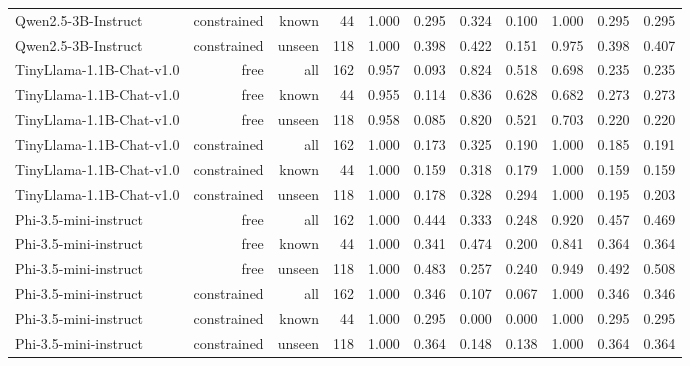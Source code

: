 \begin{table}[t]
\begin{tabular}{lrrrrrrrrrr}
Qwen2.5-3B-Instruct & constrained & known & 44 & 1.000 & 0.295 & 0.324 & 0.100 & 1.000 & 0.295 & 0.295 \\
Qwen2.5-3B-Instruct & constrained & unseen & 118 & 1.000 & 0.398 & 0.422 & 0.151 & 0.975 & 0.398 & 0.407 \\
TinyLlama-1.1B-Chat-v1.0 & free & all & 162 & 0.957 & 0.093 & 0.824 & 0.518 & 0.698 & 0.235 & 0.235 \\
TinyLlama-1.1B-Chat-v1.0 & free & known & 44 & 0.955 & 0.114 & 0.836 & 0.628 & 0.682 & 0.273 & 0.273 \\
TinyLlama-1.1B-Chat-v1.0 & free & unseen & 118 & 0.958 & 0.085 & 0.820 & 0.521 & 0.703 & 0.220 & 0.220 \\
TinyLlama-1.1B-Chat-v1.0 & constrained & all & 162 & 1.000 & 0.173 & 0.325 & 0.190 & 1.000 & 0.185 & 0.191 \\
TinyLlama-1.1B-Chat-v1.0 & constrained & known & 44 & 1.000 & 0.159 & 0.318 & 0.179 & 1.000 & 0.159 & 0.159 \\
TinyLlama-1.1B-Chat-v1.0 & constrained & unseen & 118 & 1.000 & 0.178 & 0.328 & 0.294 & 1.000 & 0.195 & 0.203 \\
Phi-3.5-mini-instruct & free & all & 162 & 1.000 & 0.444 & 0.333 & 0.248 & 0.920 & 0.457 & 0.469 \\
Phi-3.5-mini-instruct & free & known & 44 & 1.000 & 0.341 & 0.474 & 0.200 & 0.841 & 0.364 & 0.364 \\
Phi-3.5-mini-instruct & free & unseen & 118 & 1.000 & 0.483 & 0.257 & 0.240 & 0.949 & 0.492 & 0.508 \\
Phi-3.5-mini-instruct & constrained & all & 162 & 1.000 & 0.346 & 0.107 & 0.067 & 1.000 & 0.346 & 0.346 \\
Phi-3.5-mini-instruct & constrained & known & 44 & 1.000 & 0.295 & 0.000 & 0.000 & 1.000 & 0.295 & 0.295 \\
Phi-3.5-mini-instruct & constrained & unseen & 118 & 1.000 & 0.364 & 0.148 & 0.138 & 1.000 & 0.364 & 0.364 \\
\hline
\end{tabular}
\end{table}
